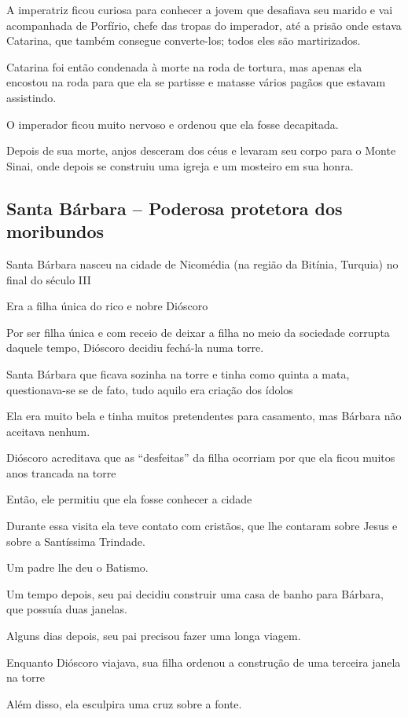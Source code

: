\documentclass[a4paper,12pt]{extarticle} \usepackage[utf8]{inputenc}
\begin{document}
A imperatriz ficou curiosa para conhecer a jovem que desafiava seu marido e vai acompanhada de Porfírio, chefe das tropas do imperador, até a prisão onde estava Catarina, que também consegue converte-los; todos eles são martirizados.

Catarina foi então condenada à morte na roda de tortura, mas apenas ela encostou na roda para que ela se partisse e matasse vários pagãos que estavam assistindo.

O imperador ficou muito nervoso e ordenou que ela fosse decapitada.

Depois de sua morte, anjos desceram dos céus e levaram seu corpo para o Monte Sinai, onde depois se construiu uma igreja e um mosteiro em sua honra.

\subsection{Santa Bárbara – Poderosa protetora dos moribundos}

Santa Bárbara nasceu na cidade de Nicomédia (na região da Bitínia, Turquia) no final do século III

Era a filha única do rico e nobre Dióscoro

Por ser filha única e com receio de deixar a filha no meio da sociedade corrupta daquele tempo, Dióscoro decidiu fechá-la numa torre.

Santa Bárbara que ficava sozinha na torre e tinha como quinta a mata, questionava-se se de fato, tudo aquilo era criação dos ídolos

Ela era muito bela e tinha muitos pretendentes para casamento, mas Bárbara não aceitava nenhum.

Dióscoro acreditava que as “desfeitas” da filha ocorriam por que ela ficou muitos anos trancada na torre

Então, ele permitiu que ela fosse conhecer a cidade

Durante essa visita ela teve contato com cristãos, que lhe contaram sobre Jesus e sobre a Santíssima Trindade.

Um padre lhe deu o Batismo.

Um tempo depois, seu pai decidiu construir uma casa de banho para Bárbara, que possuía duas janelas.

Alguns dias depois, seu pai precisou fazer uma longa viagem.

Enquanto Dióscoro viajava, sua filha ordenou a construção de uma terceira janela na torre

Além disso, ela esculpira uma cruz sobre a fonte.
\end{document}
